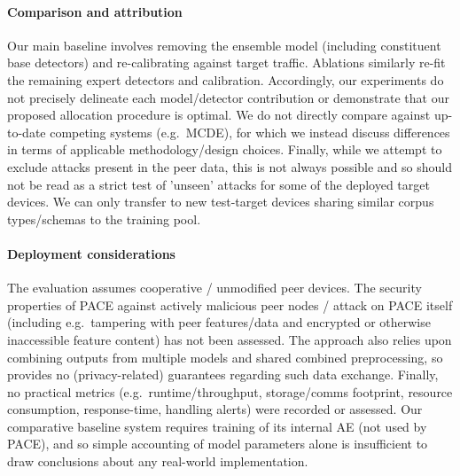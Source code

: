 \paragraph{Comparison and attribution} 
Our main baseline involves removing the ensemble model (including constituent base detectors) and re-calibrating against target traffic. Ablations similarly re-fit the remaining expert detectors and calibration. Accordingly, our experiments do not precisely delineate each model/detector contribution or demonstrate that our proposed allocation procedure is optimal. We do not directly compare against up-to-date competing systems (e.g.\ MCDE), for which we instead discuss differences in terms of applicable methodology/design choices. Finally, while we attempt to exclude attacks present in the peer data, this is not always possible and so should not be read as a strict test of 'unseen' attacks for some of the deployed target devices. We can only transfer to new test-target devices sharing similar corpus types/schemas to the training pool.

\paragraph{Deployment considerations} 
The evaluation assumes cooperative / unmodified peer devices. The security properties of PACE against actively malicious peer nodes / attack on PACE itself (including e.g.\ tampering with peer features/data and encrypted or otherwise inaccessible feature content) has not been assessed. The approach also relies upon combining outputs from multiple models and shared combined preprocessing, so provides no (privacy-related) guarantees regarding such data exchange. Finally, no practical metrics (e.g.\ runtime/throughput, storage/comms footprint, resource consumption, response-time, handling alerts) were recorded or assessed. Our comparative baseline system requires training of its internal AE (not used by PACE), and so simple accounting of model parameters alone is insufficient to draw conclusions about any real-world implementation.
